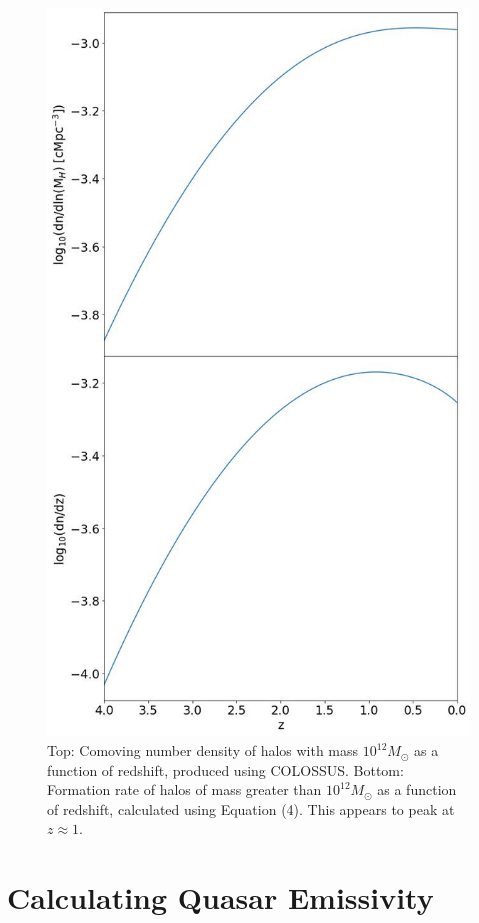 \documentclass[12pt, twocolumn]{report}%
\begin{document}
\begin{figure}[H]
\centering
\includegraphics[width=12.5cm]{Plot_6.jpeg}
\caption{Top: Comoving number density of halos with mass $10^{12}M_\odot$ as a function of redshift, produced using COLOSSUS. Bottom: Formation rate of halos of mass greater than $10^{12}M_\odot$ as a function of redshift, calculated using Equation (4). This appears to peak at $z\approx1$.}
\label{fig:6}
\end{figure}
\newpage
\twocolumngrid


\section{Calculating Quasar Emissivity}
\end{document}
